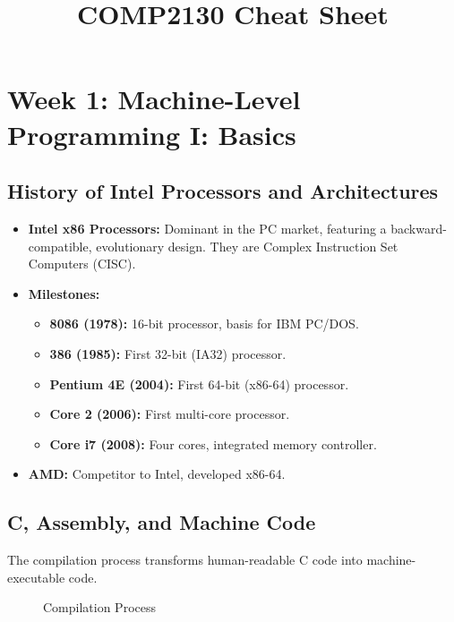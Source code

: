 \documentclass[10pt]{article}
\title{COMP2130 Cheat Sheet}
\author{}
\date{}
\begin{document}
\maketitle

\section{Week 1: Machine-Level Programming I: Basics}

\subsection{History of Intel Processors and Architectures}
\begin{itemize}
    \item \textbf{Intel x86 Processors:} Dominant in the PC market, featuring a backward-compatible, evolutionary design. They are Complex Instruction Set Computers (CISC).
    \item \textbf{Milestones:}
    \begin{itemize}
        \item \textbf{8086 (1978):} 16-bit processor, basis for IBM PC/DOS.
        \item \textbf{386 (1985):} First 32-bit (IA32) processor.
        \item \textbf{Pentium 4E (2004):} First 64-bit (x86-64) processor.
        \item \textbf{Core 2 (2006):} First multi-core processor.
        \item \textbf{Core i7 (2008):} Four cores, integrated memory controller.
    \end{itemize}
    \item \textbf{AMD:} Competitor to Intel, developed x86-64.
\end{itemize}

\subsection{C, Assembly, and Machine Code}
The compilation process transforms human-readable C code into machine-executable code.
\begin{figure}[h]
    \centering
    \caption{Compilation Process}
\end{figure}
\end{document}
